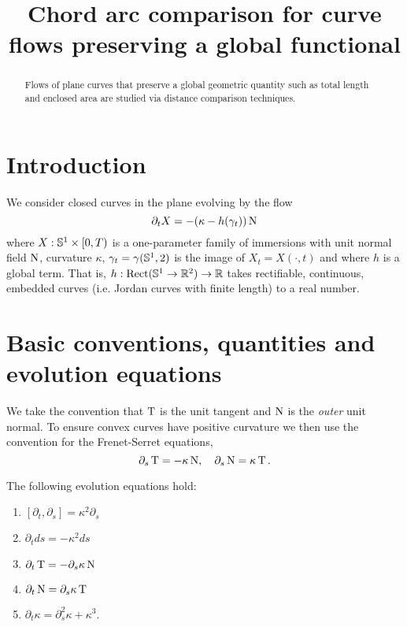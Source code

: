 \documentclass[a4paper, 12pt]{amsart}
\title[Chord arc comparison for preserving flows]{Chord arc comparison for curve flows preserving a global functional}
\date{}
\begin{document}
\begin{abstract}
Flows of plane curves that preserve a global geometric quantity such as total length and enclosed area are studied via distance comparison techniques.
\end{abstract}

\maketitle

\section{Introduction}
\label{sec:intro}

We consider closed curves in the plane evolving by the flow
\begin{equation}
\label{eq:flow}
\partial_t X = -(\kappa - h(\gamma_t)) \nor
\end{equation}
where \(X : \S^1 \times [0, T)\) is a one-parameter family of immersions with unit normal field \(\nor\), curvature \(\kappa\), \(\gamma_t = \gamma(\S^1, 2)\) is the image of \(X_t = X(\cdot, t)\) and where \(h\) is a global term. That is, \(h : \rect (\S^1 \to \R^2) \to \R\) takes rectifiable, continuous, embedded curves (i.e. Jordan curves with finite length) to a real number.

\section{Basic conventions, quantities and evolution equations}
\label{sec:basic}

We take the convention that \(\tang\) is the unit tangent and \(\nor\) is the \emph{outer} unit normal. To ensure convex curves have positive curvature we then use the convention for the Frenet-Serret equations,
\begin{equation}
\label{eq:fs}
\partial_s \tang = - \kappa \nor, \quad \partial_s \nor = \kappa \tang.
\end{equation}

\begin{lemma}
\label{lem:basic_evolution}
The following evolution equations hold:
\begin{enumerate}
\item \([\partial_t, \partial_s] = \kappa^2 \partial_s\)
\item \(\partial_t ds = -\kappa^2 ds\)
\item \(\partial_t \tang = -\partial_s \kappa\nor\)
\item \(\partial_t \nor = \partial_s \kappa \tang\)
\item \(\partial_t \kappa = \partial_s^2 \kappa + \kappa^3\).
\end{enumerate}
\end{lemma}
\end{document}
